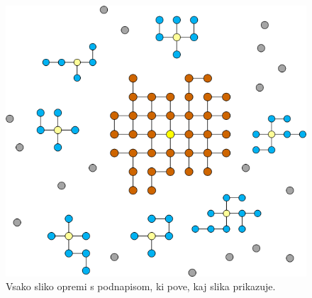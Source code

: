 \documentclass[a4paper,11pt]{article}
\begin{document}
\begin{figure}[h!]
\begin{center}
\includegraphics[scale=03]{slika-primer.png}
\caption{Vsako sliko opremi s podnapisom, ki pove, kaj slika prikazuje.}
\label{slika2}
\end{center}
\end{figure}
\end{document}
